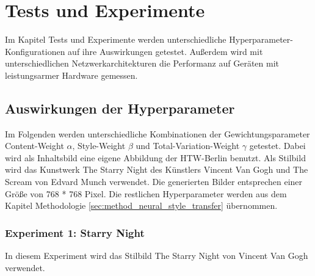 \chapter{Tests und Experimente}
\label{cha:tests}

Im Kapitel Tests und Experimente werden unterschiedliche Hyperparameter-Konfigurationen auf ihre Auswirkungen getestet. Außerdem wird mit unterschiedlichen Netzwerkarchitekturen die Performanz auf Geräten mit leistungsarmer Hardware gemessen.

\section{Auswirkungen der Hyperparameter}

Im Folgenden werden unterschiedliche Kombinationen der Gewichtungsparameter Content-Weight $ \alpha $, Style-Weight $ \beta $ und Total-Variation-Weight $ \gamma $ getestet. Dabei wird als Inhaltsbild  eine eigene Abbildung der HTW-Berlin benutzt. Als Stilbild wird das Kunstwerk The Starry Night des Künstlers Vincent Van Gogh und The Scream von Edvard Munch verwendet. Die generierten Bilder entsprechen einer Größe von 768 * 768 Pixel. Die restlichen Hyperparameter werden aus dem Kapitel Methodologie \ref{sec:method_neural_style_transfer} übernommen.

\pagebreak

\subsection{Experiment 1: Starry Night}

In diesem Experiment wird das Stilbild The Starry Night von Vincent Van Gogh verwendet.

